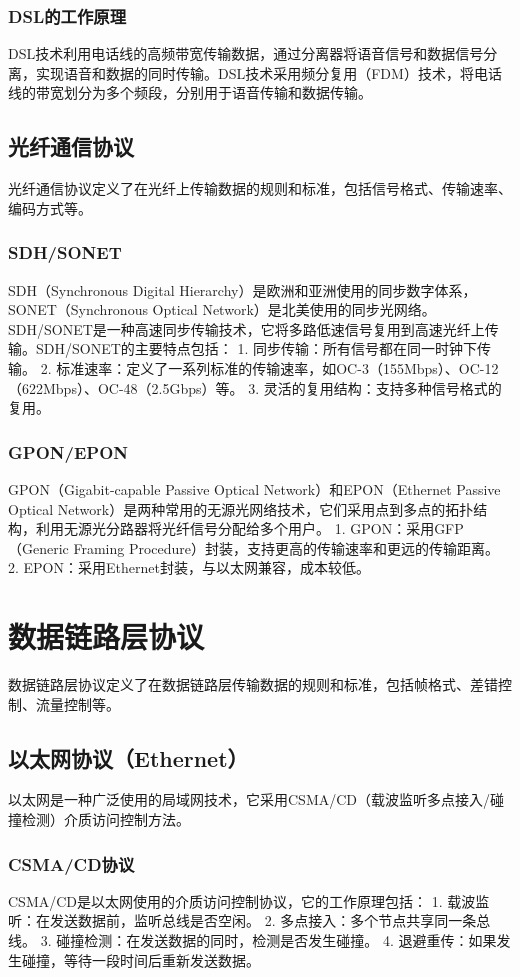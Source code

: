 \documentclass{book}
\begin{document}
\subsubsection{DSL的工作原理}
DSL技术利用电话线的高频带宽传输数据，通过分离器将语音信号和数据信号分离，实现语音和数据的同时传输。DSL技术采用频分复用（FDM）技术，将电话线的带宽划分为多个频段，分别用于语音传输和数据传输。
\subsection{光纤通信协议}
光纤通信协议定义了在光纤上传输数据的规则和标准，包括信号格式、传输速率、编码方式等。
\subsubsection{SDH/SONET}
SDH（Synchronous Digital Hierarchy）是欧洲和亚洲使用的同步数字体系，SONET（Synchronous Optical Network）是北美使用的同步光网络。SDH/SONET是一种高速同步传输技术，它将多路低速信号复用到高速光纤上传输。SDH/SONET的主要特点包括：
1. 同步传输：所有信号都在同一时钟下传输。
2. 标准速率：定义了一系列标准的传输速率，如OC-3（155Mbps）、OC-12（622Mbps）、OC-48（2.5Gbps）等。
3. 灵活的复用结构：支持多种信号格式的复用。
\subsubsection{GPON/EPON}
GPON（Gigabit-capable Passive Optical Network）和EPON（Ethernet Passive Optical Network）是两种常用的无源光网络技术，它们采用点到多点的拓扑结构，利用无源光分路器将光纤信号分配给多个用户。
1. GPON：采用GFP（Generic Framing Procedure）封装，支持更高的传输速率和更远的传输距离。
2. EPON：采用Ethernet封装，与以太网兼容，成本较低。
\section{数据链路层协议}
数据链路层协议定义了在数据链路层传输数据的规则和标准，包括帧格式、差错控制、流量控制等。
\subsection{以太网协议（Ethernet）}
以太网是一种广泛使用的局域网技术，它采用CSMA/CD（载波监听多点接入/碰撞检测）介质访问控制方法。
\subsubsection{CSMA/CD协议}
CSMA/CD是以太网使用的介质访问控制协议，它的工作原理包括：
1. 载波监听：在发送数据前，监听总线是否空闲。
2. 多点接入：多个节点共享同一条总线。
3. 碰撞检测：在发送数据的同时，检测是否发生碰撞。
4. 退避重传：如果发生碰撞，等待一段时间后重新发送数据。
\end{document}
